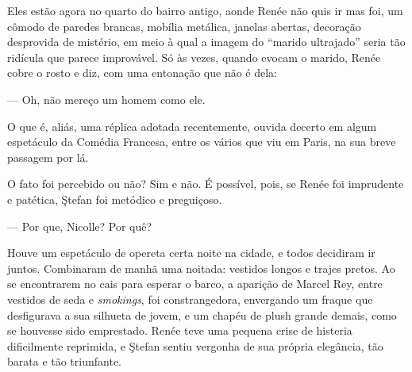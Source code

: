 Eles estão agora no quarto do bairro antigo, aonde Renée não quis ir mas
foi, um cômodo de paredes brancas, mobília metálica, janelas abertas,
decoração desprovida de mistério, em meio à qual a imagem do ``marido
ultrajado'' seria tão ridícula que parece improvável. Só às vezes,
quando evocam o marido, Renée cobre o rosto e diz, com uma entonação que
não é dela:

--- Oh, não mereço um homem como ele.

O que é, aliás, uma réplica adotada recentemente, ouvida decerto em
algum espetáculo da Comédia Francesa, entre os vários que viu em Paris,
na sua breve passagem por lá.

O fato foi percebido ou não? Sim e não. É possível, pois, se Renée foi
imprudente e patética, Ştefan foi metódico e preguiçoso.



--- Por que, Nicolle? Por quê?



Houve um espetáculo de opereta certa noite na cidade, e todos decidiram
ir juntos. Combinaram de manhã uma noitada: vestidos longos e trajes
pretos. Ao se encontrarem no cais para esperar o barco, a aparição de
Marcel Rey, entre vestidos de seda e \textit{smokings}, foi constrangedora,
envergando um fraque que desfigurava a sua silhueta de jovem, e um
chapéu de plush grande demais, como se houvesse sido emprestado. Renée
teve uma pequena crise de histeria dificilmente reprimida, e Ştefan
sentiu vergonha de sua própria elegância, tão barata e tão triunfante.

